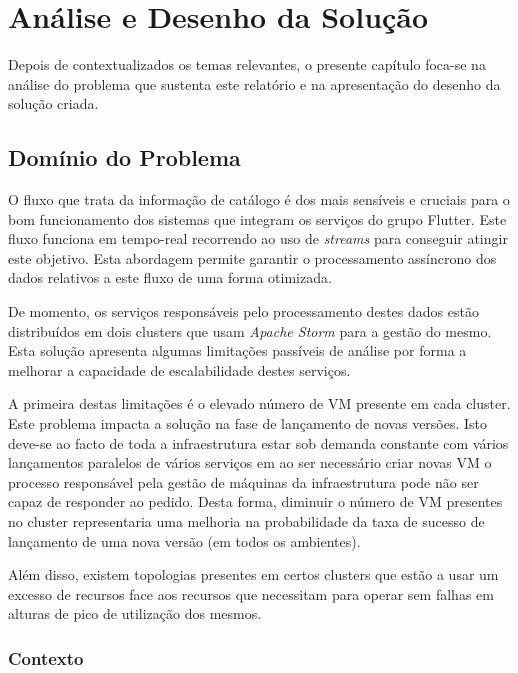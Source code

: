 \chapter{Análise e Desenho da Solução}
\label{sec:3-Analise}

Depois de contextualizados os temas relevantes, o presente capítulo foca-se na análise do problema 
que sustenta este relatório e na apresentação do desenho da solução criada.

\section{Domínio do Problema}

O fluxo que trata da informação de catálogo é dos mais sensíveis e cruciais para o bom funcionamento
dos sistemas que integram os serviços do grupo Flutter. Este fluxo funciona em tempo-real recorrendo
ao uso de \textit{streams} para conseguir atingir este objetivo. Esta abordagem permite garantir
o processamento assíncrono dos dados relativos a este fluxo de uma forma otimizada.

De momento, os serviços responsáveis pelo processamento destes dados estão distribuídos em dois
\glspl{cluster} que usam \textit{Apache Storm} para a gestão do mesmo. Esta solução apresenta algumas
limitações passíveis de análise por forma a melhorar a capacidade de escalabilidade destes serviços. 

A primeira destas limitações é o elevado número de \ac{VM} presente em cada \gls{cluster}. Este 
problema impacta a solução na fase de lançamento de novas versões. Isto deve-se ao facto de toda a 
infraestrutura estar sob demanda constante com vários lançamentos paralelos de vários serviços em 
ao ser necessário criar novas \ac{VM} o processo responsável pela gestão de máquinas da
infraestrutura pode não ser capaz de responder ao pedido. Desta forma, diminuir o número de \ac{VM}
presentes no \gls{cluster} representaria uma melhoria na probabilidade da taxa de sucesso de
lançamento de uma nova versão (em todos os ambientes).

Além disso, existem topologias presentes em certos \glspl{cluster} que estão a usar um excesso de
recursos face aos recursos que necessitam para operar sem falhas em alturas de pico de utilização
dos mesmos.

\subsection{Contexto}

